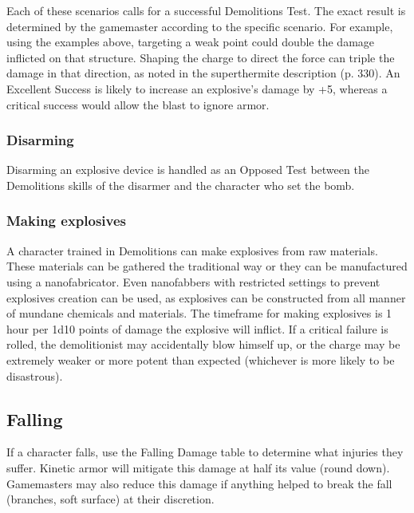 Each of these scenarios calls for a successful Demolitions Test. The exact result is determined by the gamemaster according to the specific scenario. For example, using the examples above, targeting a weak point could double the damage inflicted on that structure. Shaping the charge to direct the force can triple the damage in that direction, as noted in the superthermite description (p. 330). An Excellent Success is likely to increase an explosive’s damage by +5, whereas a critical success would allow the blast to ignore armor. 

\subsubsection{Disarming} 

Disarming an explosive device is handled as an Opposed Test between the Demolitions skills of the disarmer and the character who set the bomb. 



\subsubsection{Making explosives} 

A character trained in Demolitions can make explosives from raw materials. These materials can be gathered the traditional way or they can be manufactured using a nanofabricator. Even nanofabbers with restricted settings to prevent explosives creation can be used, as explosives can be constructed from all manner of mundane chemicals and materials. The timeframe for making explosives is 1 hour per 1d10 points of damage the explosive will inflict. If a critical failure is rolled, the demolitionist may accidentally blow himself up, or the charge may be extremely weaker or more potent than expected (whichever is more likely to be disastrous). 



\subsection{Falling} \label{sec:falling} 

If a character falls, use the Falling Damage table to determine what injuries they suffer. Kinetic armor will mitigate this damage at half its value (round down). Gamemasters may also reduce this damage if anything helped to break the fall (branches, soft surface) at their discretion. 

